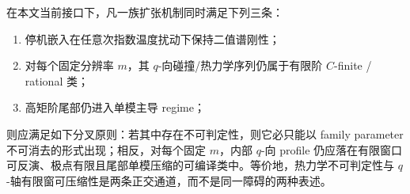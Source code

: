 \begin{conjecture}\label{conj:conclusion-halting-fixedm-finitewindow-infinitefamily-principle}
在本文当前接口下，凡一族扩张机制同时满足下列三条：
\begin{enumerate}
  \item 停机嵌入在任意次指数温度扰动下保持二值谱刚性；
  \item 对每个固定分辨率 \(m\)，其 \(q\)-向碰撞/热力学序列仍属于有限阶 \(C\)-finite / rational 类；
  \item 高矩阶尾部仍进入单模主导 regime；
\end{enumerate}
则应满足如下分叉原则：若其中存在不可判定性，则它必只能以 family parameter 不可消去的形式出现；相反，对每个固定 \(m\)，内部 \(q\)-向 profile 仍应落在有限窗口可反演、极点有限且尾部单模压缩的可编译类中。等价地，热力学不可判定性与 \(q\)-轴有限窗可压缩性是两条正交通道，而不是同一障碍的两种表述。
\end{conjecture}
